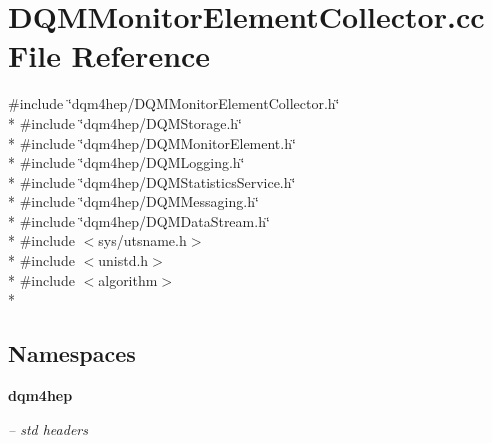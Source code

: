 \section{D\+Q\+M\+Monitor\+Element\+Collector.\+cc File Reference}
\label{DQMMonitorElementCollector_8cc}
{\ttfamily \#include \char`\"{}dqm4hep/\+D\+Q\+M\+Monitor\+Element\+Collector.\+h\char`\"{}}\\*
{\ttfamily \#include \char`\"{}dqm4hep/\+D\+Q\+M\+Storage.\+h\char`\"{}}\\*
{\ttfamily \#include \char`\"{}dqm4hep/\+D\+Q\+M\+Monitor\+Element.\+h\char`\"{}}\\*
{\ttfamily \#include \char`\"{}dqm4hep/\+D\+Q\+M\+Logging.\+h\char`\"{}}\\*
{\ttfamily \#include \char`\"{}dqm4hep/\+D\+Q\+M\+Statistics\+Service.\+h\char`\"{}}\\*
{\ttfamily \#include \char`\"{}dqm4hep/\+D\+Q\+M\+Messaging.\+h\char`\"{}}\\*
{\ttfamily \#include \char`\"{}dqm4hep/\+D\+Q\+M\+Data\+Stream.\+h\char`\"{}}\\*
{\ttfamily \#include $<$sys/utsname.\+h$>$}\\*
{\ttfamily \#include $<$unistd.\+h$>$}\\*
{\ttfamily \#include $<$algorithm$>$}\\*
\subsection*{Namespaces}
\begin{DoxyCompactItemize}
\item 
 {\bf dqm4hep}
\begin{DoxyCompactList}\small\item\em -- std headers \end{DoxyCompactList}\end{DoxyCompactItemize}
